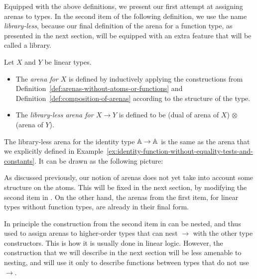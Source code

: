 \documentclass[a4paper,UKenglish,cleveref, autoref, numberwithinsect, thm-restate]{lipics-v2021}
\begin{document}
Equipped with the above definitions, we  present our first attempt at assigning arenas to types. In the second item of the following definition, we use the name \emph{library-less}, because our final definition of the arena for a function type, as presented in the next section, will be equipped with an extra feature that will be called a library. 


\begin{definition}\label{def:library-less} Let $X$ and $Y$ be linear types.
    \begin{itemize}
        \item The \emph{arena for  $X$} is defined by inductively applying the constructions from Definition~\ref{def:arenas-without-atoms-or-functions} and Definition~\ref{def:composition-of-arenas} according to the structure of the type.
        \item The \emph{library-less arena for $X \to Y$} is defined to be (dual of arena of $X$) $\otimes$ (arena of $Y$).
    \end{itemize}
\end{definition}
\begin{example}
    The library-less arena for the identity type $\mathbb A \to \mathbb A$ is the same as the arena that we explicitly defined in Example~\ref{ex:identity-function-without-equality-tests-and-constants}. It can be drawn as the following picture:
\end{example}

As discussed previously, our notion of arenas does not yet take into account some structure on the atoms. This will be fixed in the next section, by modifying the second item in . On the other hand, the arenas from the first item, for linear types without function types, are already in their final form. 

In principle the construction from the second item in  can be nested, and thus used to assign arenas to higher-order types that can nest $\to$ with the other type constructors. This is how it is usually done in linear logic. However,  the construction that we will describe in the next section will  be less amenable to nesting, and will use it only  to describe functions between types that do not use $\to$.


 
\end{document}
